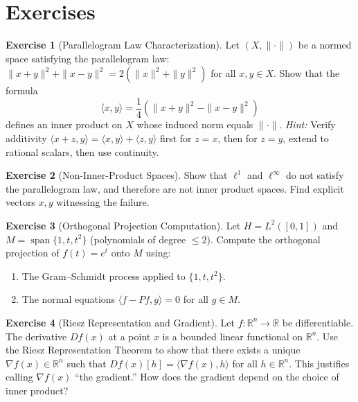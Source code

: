 \documentclass[11pt,a4paper]{article}
\theoremstyle{definition}
\newtheorem{exercise}{Exercise}[section]
\theoremstyle{plain}
\theoremstyle{remark}
\newcommand{\R}{\mathbb{R}}
\DeclareMathOperator{\spn}{span}
\begin{document}
\section{Exercises}\label{sec:exercises}

\begin{exercise}[Parallelogram Law Characterization]\label{ex:parallelogram}
Let $(X, \|\cdot\|)$ be a normed space satisfying the parallelogram law:
$\|x + y\|^2 + \|x - y\|^2 = 2(\|x\|^2 + \|y\|^2)$ for all $x, y \in X$.
Show that the formula
\[
    \langle x, y \rangle = \frac{1}{4}(\|x+y\|^2 - \|x-y\|^2)
\]
defines an inner product on $X$ whose induced norm equals $\|\cdot\|$.
\emph{Hint:} Verify additivity $\langle x + z, y \rangle = \langle x, y \rangle
+ \langle z, y \rangle$ first for $z = x$, then for $z = y$, extend to
rational scalars, then use continuity.
\end{exercise}

\begin{exercise}[Non-Inner-Product Spaces]\label{ex:non-ip}
Show that $\ell^1$ and $\ell^\infty$ do not satisfy the parallelogram law,
and therefore are not inner product spaces. Find explicit vectors $x, y$
witnessing the failure.
\end{exercise}

\begin{exercise}[Orthogonal Projection Computation]\label{ex:proj-computation}
Let $H = L^2([0, 1])$ and $M = \spn\{1, t, t^2\}$ (polynomials of degree
$\leq 2$). Compute the orthogonal projection of $f(t) = e^t$ onto $M$ using:
\begin{enumerate}[label=(\alph*)]
    \item The Gram--Schmidt process applied to $\{1, t, t^2\}$.
    \item The normal equations $\langle f - Pf, g \rangle = 0$ for all $g \in M$.
\end{enumerate}
\end{exercise}

\begin{exercise}[Riesz Representation and Gradient]\label{ex:riesz-gradient}
Let $f \colon \R^n \to \R$ be differentiable. The derivative $Df(x)$ at a
point $x$ is a bounded linear functional on $\R^n$. Use the Riesz
Representation Theorem to show that there exists a unique $\nabla f(x) \in \R^n$
such that $Df(x)[h] = \langle \nabla f(x), h \rangle$ for all $h \in \R^n$.
This justifies calling $\nabla f(x)$ ``the gradient.'' How does the gradient
depend on the choice of inner product?
\end{exercise}
\end{document}
